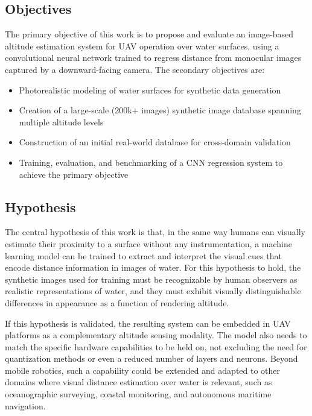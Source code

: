\subsection{Objectives}

The primary objective of this work is to propose and evaluate an image-based altitude estimation system for UAV operation over water surfaces, using a convolutional neural network trained to regress distance from monocular images captured by a downward-facing camera. The secondary objectives are:

\begin{itemize}
\item Photorealistic modeling of water surfaces for synthetic data generation
\item Creation of a large-scale (200k+ images) synthetic image database spanning multiple altitude levels
\item Construction of an initial real-world database for cross-domain validation
\item Training, evaluation, and benchmarking of a CNN regression system to achieve the primary objective
\end{itemize}

\subsection{Hypothesis}

The central hypothesis of this work is that, in the same way humans can visually estimate their proximity to a surface without any instrumentation, a machine learning model can be trained to extract and interpret the visual cues that encode distance information in images of water. For this hypothesis to hold, the synthetic images used for training must be recognizable by human observers as realistic representations of water, and they must exhibit visually distinguishable differences in appearance as a function of rendering altitude.

If this hypothesis is validated, the resulting system can be embedded in UAV platforms as a complementary altitude sensing modality. The model also needs to match the specific hardware capabilities to be held on, not excluding the need for quantization methods or even a reduced number of layers and neurons. Beyond mobile robotics, such a capability could be extended and adapted to other domains where visual distance estimation over water is relevant, such as oceanographic surveying, coastal monitoring, and autonomous maritime navigation.

